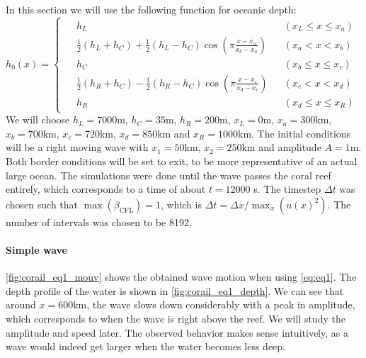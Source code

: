 In this section we will use the following function for oceanic depth:
\begin{equation}
    h_0(x) = \begin{cases}
        \begin{aligned}
            &h_L &&(x_L \le x \le x_a) \\
            &\frac{1}{2}(h_L + h_C) + \frac{1}{2}(h_L - h_C) \cos \left( \pi \frac{x-x_a}{x_b-x_a} \right) &&(x_a < x < x_b) \\
            &h_C &&(x_b \le x \le x_c) \\
            &\frac{1}{2}(h_R + h_C) - \frac{1}{2}(h_R - h_C) \cos \left( \pi \frac{x-x_c}{x_d-x_c} \right) &&(x_c < x < x_d) \\
            &h_R &&(x_d \le x \le x_R)
        \end{aligned}
    \end{cases}
\end{equation}
We will choose \(h_L = 7000\)m, \(h_C = 35\)m, \(h_R = 200\)m, \(x_L = 0\)m, \(x_a = 300\)km, \(x_b = 700\)km, \(x_c = 720\)km, \(x_d = 850\)km and \(x_R = 1000\)km. The initial conditions will be a right moving wave with \(x_1 = 50\)km, \(x_2 = 250\)km and amplitude \(A = 1\)m. Both border conditions will be set to exit, to be more representative of an actual large ocean. The simulations were done until the wave passes the coral reef entirely, which corresponds to a time of about \(t = 12000\) \si{\second}. The timestep \(\Delta t\) was chosen such that \(\max(\beta_{\textrm{CFL}}) = 1\), which is \(\Delta t = \Delta x / \max_x(u(x)^2)\). The number of intervals was chosen to be 8192.

\paragraph{Simple wave} \autoref{fig:corail_eq1_mouv} shows the obtained wave motion when using \autoref{eq:eq1}. The depth profile of the water is shown in \autoref{fig:corail_eq1_depth}. We can see that around \(x=600\)km, the wave slows down considerably with a peak in amplitude, which corresponds to when the wave is right above the reef. We will study the amplitude and speed later. The observed behavior makes sense intuitively, as a wave would indeed get larger when the water becomes less deep.

